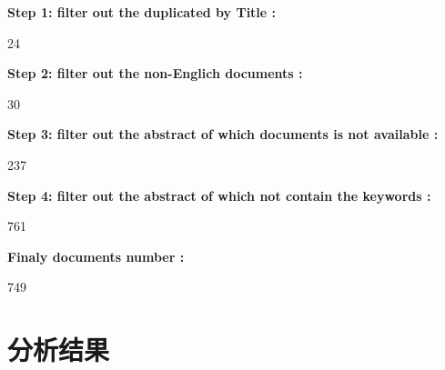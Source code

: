 \documentclass[
]{article}
\begin{document}
\begin{center}\begin{tcolorbox}[colback=gray!10, colframe=gray!50, width=0.9\linewidth, arc=1mm, boxrule=0.5pt]
\textbf{
Step 1: filter out the duplicated by Title
:}

\vspace{0.5em}

    24

\vspace{2em}


\textbf{
Step 2: filter out the non-Englich documents
:}

\vspace{0.5em}

    30

\vspace{2em}


\textbf{
Step 3: filter out the abstract of which documents is not available
:}

\vspace{0.5em}

    237

\vspace{2em}


\textbf{
Step 4: filter out the abstract of which not contain the keywords
:}

\vspace{0.5em}

    761

\vspace{2em}


\textbf{
Finaly documents number
:}

\vspace{0.5em}

    749

\vspace{2em}
\end{tcolorbox}
\end{center}

\hypertarget{results}{%
\section{分析结果}\label{results}}
\end{document}
